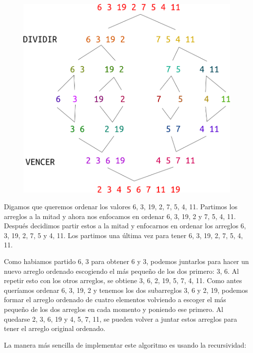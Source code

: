 \documentclass{article}
\begin{document}
\begin{figure}[H]
    \centering
    \includegraphics[width=0.4\paperwidth]{mergesort}
\end{figure}

Digamos que queremos ordenar los valores {6, 3, 19, 2, 7, 5, 4, 11}. Partimos los arreglos a la mitad y ahora nos enfocamos en ordenar {6, 3, 19, 2} y {7, 5, 4, 11}. Después decidimos partir estos a la mitad y enfocarnos en ordenar los arreglos {6, 3}, {19, 2}, {7, 5} y {4, 11}. Los partimos una última vez para tener {6}, {3}, {19}, {2}, {7}, {5}, {4}, {11}.

Como habiamos partido {6, 3} para obtener {6} y {3}, podemos juntarlos para hacer un nuevo arreglo ordenado escogiendo el más pequeño de los dos primero: {3, 6}. Al repetir esto con los otros arreglos, se obtiene {3, 6}, {2, 19}, {5, 7}, {4, 11}. Como antes queríamos ordenar {6, 3, 19, 2} y tenemos los dos subarreglos {3, 6} y {2, 19}, podemos formar el arreglo ordenado de cuatro elementos volviendo a escoger el más pequeño de los dos arreglos en cada momento y poniendo ese primero. Al quedarse {2, 3, 6, 19} y {4, 5, 7, 11}, se pueden volver a juntar estos arreglos para tener el arreglo original ordenado.

La manera más sencilla de implementar este algoritmo es usando la recursividad:
\end{document}
